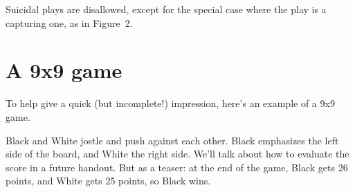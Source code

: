 \documentclass{article}
\begin{document}
\begin{center}
%
\end{center}
Suicidal plays are disallowed, except for the special case where the
play is a capturing one, as in Figure~2.







\section*{A 9x9 game}
To help give a quick (but incomplete!) impression, here's an example
of a 9x9 game.
%
\begin{center}
\hspace{1in}%
\hspace{1in}%
\end{center}
%
Black and White jostle and push against each other.  Black emphasizes
the left side of the board, and White the right side.  We'll talk
about how to evaluate the score in a future handout.  But as a teaser:
at the end of the game, Black gets 26 points, and White gets 25
points, so Black wins.
\end{document}
